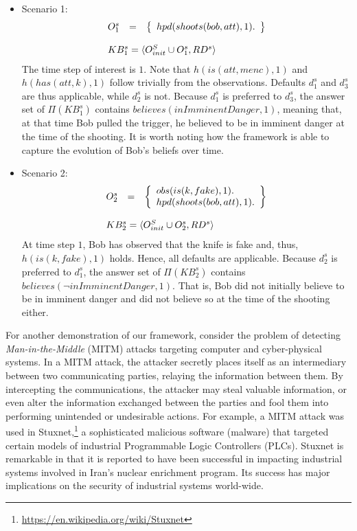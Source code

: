 \documentclass{article}
\begin{document}
\begin{itemize}
\item Scenario 1: \[
\begin{array}{lll}
O^s_{1} & = & \left\{
\begin{array}{l} 
hpd(shoots(bob,att),1). 
\end{array}
\right\}\\
\ \\
\multicolumn{3}{l}{KB^s_1=\langle O^S_{init} \cup O^s_1,RD^s \rangle}
\end{array}
\]
The time step of interest is $1$. Note that $h(is(att,menc),1)$ and $h(has(att,k),1)$ follow trivially from the observations. Defaults $d^s_1$ and $d^s_3$ are thus applicable, while $d^{s}_2$ is not.  Because $d^s_1$ is preferred to $d^s_3$, the answer set of $\Pi(KB^s_1)$ contains $believes(inImminentDanger, 1)$, meaning that, at that time Bob pulled the trigger, he believed to be in imminent danger at the time of the shooting. It is worth noting how the framework is able to capture the evolution of Bob's beliefs over time.  
\item Scenario 2: \[
\begin{array}{lll}
O^s_{2} & = & \left\{
\begin{array}{l} 
obs(is(k,fake),1). \\   %
hpd(shoots(bob,att),1).
\end{array}
\right\} \\
\ \\
\multicolumn{3}{l}{KB^s_2=\langle O^S_{init} \cup O^s_2,RD^s \rangle}
\end{array}
\]
At time step $1$, Bob has observed that the knife is fake and, thus, $h(is(k,fake),1)$ holds. Hence, all defaults are applicable.  Because $d^s_2$ is preferred to $d^s_1$, the answer set of $\Pi(KB^s_2)$ contains $believes(\neg inImminentDanger, 1)$. That is, Bob did not initially believe to be in imminent danger and did not believe so at the time of the shooting either. 
\end{itemize}


For another demonstration of our framework, consider the problem of detecting \emph{Man-in-the-Middle} (MITM) attacks targeting computer and cyber-physical systems.  In a MITM attack, the attacker secretly places itself as an intermediary between two communicating parties, relaying the information between them. By intercepting the communications, the attacker may steal valuable information, or even alter the information exchanged between the parties and fool them into performing unintended or undesirable actions. 
For example, a MITM attack was used in Stuxnet,\footnote{\tiny \url{https://en.wikipedia.org/wiki/Stuxnet}} a sophisticated malicious software (malware) that targeted certain models of industrial Programmable Logic Controllers (PLCs). Stuxnet is remarkable in that it is reported to have been successful in impacting industrial systems involved in Iran's nuclear enrichment program. Its success has major implications on the security  of industrial systems world-wide.
\end{document}
